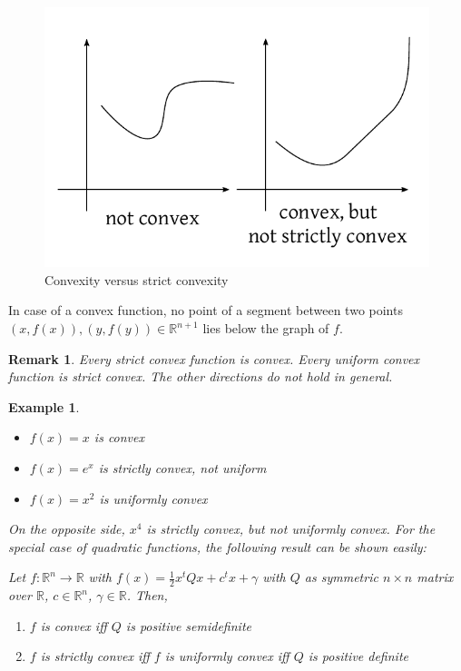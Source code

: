 \documentclass[a4paper]{article}
\numberwithin{lecref}{subsection}
\newtheorem*{Example}{Example}
\newtheorem*{Remark}{Remark}
\begin{document}
\begin{figure}[t]
	\begin{center}
		\includegraphics{img/20_strict_convexity.pdf}
		\caption{Convexity versus strict convexity}
		\label{img:convexity}
	\end{center}
\end{figure}

In case of a convex function, no point of a segment between two points $(x, f(x)), (y, f(y)) \in \mathbb R^{n+1}$ lies below the graph of $f$.

\begin{Remark}
	Every strict convex function is convex.
	Every uniform convex function is strict convex.
	The other directions do not hold in general.
\end{Remark}

\begin{Example}
	\begin{itemize}
		\item $f(x) = x$ is convex
		\item $f(x) = e^x$ is strictly convex, not uniform
		\item $f(x) = x^2$ is uniformly convex
	\end{itemize}
	On the opposite side, $x^4$ is strictly convex, but not uniformly convex.
	For the special case of quadratic functions, the following result can be shown easily:

	Let $f: \mathbb R^n \to \mathbb R$ with $f(x) = \frac12 x^t Qx + c^t x + \gamma$ with $Q$ as symmetric $n \times n$ matrix over $\mathbb R$, $c \in \mathbb R^n$, $\gamma \in \mathbb R$. Then,
	\begin{enumerate}
		\item $f$ is convex iff $Q$ is positive semidefinite
		\item $f$ is strictly convex iff $f$ is uniformly convex iff $Q$ is positive definite
	\end{enumerate}
\end{Example}
\end{document}
